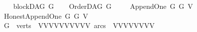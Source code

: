 \begin{isabellebody}
\ \ \isamarkupfalse%
\ {\isachardoublequoteopen}blockDAG\ {\isacharquery}{\kern0pt}G{}{\isachardoublequoteclose}\isanewline
\ \ \isamarkupfalse%
\ {\isachardoublequoteopen}OrderDAG\ {\isacharquery}{\kern0pt}G{}\ {}{\isachardoublequoteclose}\isanewline
\ \ \isamarkupfalse%
\ {\isachardoublequoteopen}Append{\isacharunderscore}{\kern0pt}One\ {\isacharquery}{\kern0pt}G\ {\isacharquery}{\kern0pt}G{}\ V{}{\isachardoublequoteclose}\isanewline
\ \ \isamarkupfalse%
\ {\isachardoublequoteopen}Honest{\isacharunderscore}{\kern0pt}Append{\isacharunderscore}{\kern0pt}One\ {\isacharquery}{\kern0pt}G\ {\isacharquery}{\kern0pt}G{}\ V{}{\isachardoublequoteclose}\isanewline
\ \ \isamarkupfalse%
\ {\isacharquery}{\kern0pt}G{}\ {\isacharequal}{\kern0pt}\ {\isachardoublequoteopen}{\isasymlparr}verts\ {\isacharequal}{\kern0pt}\ {\isacharbraceleft}{\kern0pt}V{}{\isacharcomma}{\kern0pt}V{}{\isacharcomma}{\kern0pt}V{}{\isacharcomma}{\kern0pt}V{}{\isacharcomma}{\kern0pt}V{}{\isacharcomma}{\kern0pt}V{}{\isacharcomma}{\kern0pt}V{}{\isacharcomma}{\kern0pt}V{}{\isacharcomma}{\kern0pt}V{}{\isacharcomma}{\kern0pt}V{}{}{\isacharbraceright}{\kern0pt}{\isacharcomma}{\kern0pt}\ arcs\ {\isacharequal}{\kern0pt}\ {\isacharbraceleft}{\kern0pt}{\isacharparenleft}{\kern0pt}V{}{\isacharcomma}{\kern0pt}V{}{\isacharparenright}{\kern0pt}{\isacharcomma}{\kern0pt}{\isacharparenleft}{\kern0pt}V{}{\isacharcomma}{\kern0pt}V{}{\isacharparenright}{\kern0pt}{\isacharcomma}{\kern0pt}{\isacharparenleft}{\kern0pt}V{}{\isacharcomma}{\kern0pt}V{}{\isacharparenright}{\kern0pt}{\isacharcomma}{\kern0pt}{\isacharparenleft}{\kern0pt}V{}{\isacharcomma}{\kern0pt}V{}{\isacharparenright}{\kern0pt}{\isacharcomma}{\kern0pt}\isanewline

\end{isabellebody}
